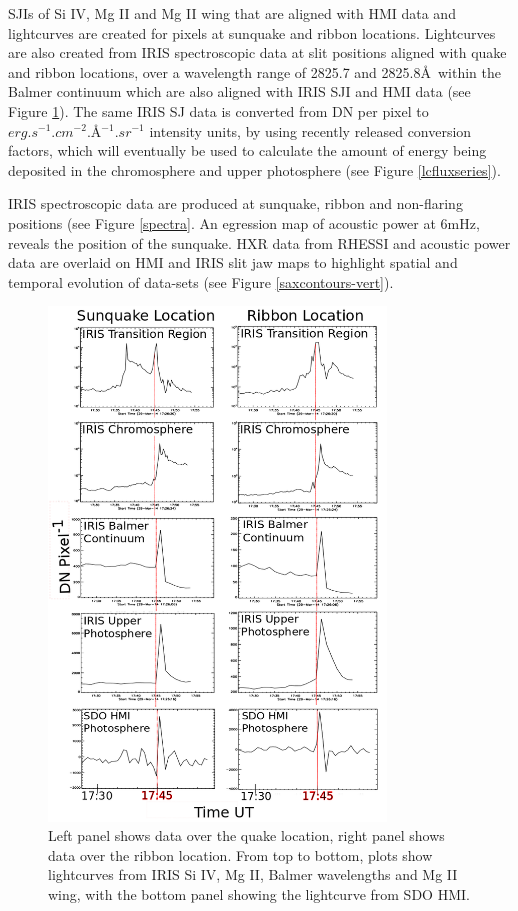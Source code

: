 SJIs of Si IV, Mg II and Mg II wing that are aligned with HMI data and lightcurves are created for pixels at sunquake and ribbon locations. Lightcurves are also created from IRIS spectroscopic data at slit positions aligned with quake and ribbon locations, over a wavelength range of 2825.7 and 2825.8\AA\ within the Balmer continuum which are also aligned with IRIS SJI and HMI data (see Figure \ref{lcseries-bold}). The same IRIS SJ data is converted from DN per pixel to $erg.s^{-1}.cm^{-2}.$\AA$^{-1}.sr^{-1}$ intensity units, by using recently released conversion factors, which will eventually be used to calculate the amount of energy being deposited in the chromosphere and upper photosphere (see Figure \ref{lcfluxseries}).   

IRIS spectroscopic data are produced at sunquake, ribbon and non-flaring positions (see Figure \ref{spectra}. An egression map of acoustic power  at 6mHz, reveals the position of the sunquake. HXR data from RHESSI and acoustic power data are overlaid on HMI and IRIS slit jaw maps to highlight spatial and temporal evolution of data-sets (see Figure \ref{saxcontours-vert}).\\

\begin{figure}%
  \begin{center}
  \includegraphics[width=0.8\textwidth]{lcseries-bold}
  \end{center}
  \caption{Left panel shows data over the quake location, right panel shows data over the ribbon location. From top to bottom, plots show lightcurves from IRIS Si IV, Mg II, Balmer wavelengths and Mg II wing, with the bottom panel showing the lightcurve from SDO HMI.}\label{lcseries-bold}
\end{figure}

